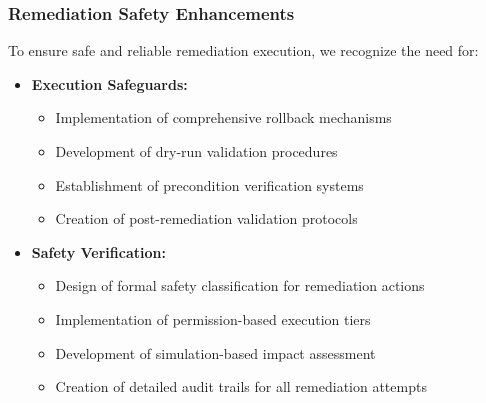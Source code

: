 \subsubsection{Remediation Safety Enhancements}
To ensure safe and reliable remediation execution, we recognize the need for:
\begin{itemize}
    \item \textbf{Execution Safeguards:}
        \begin{itemize}
            \item Implementation of comprehensive rollback mechanisms
            \item Development of dry-run validation procedures
            \item Establishment of precondition verification systems
            \item Creation of post-remediation validation protocols
        \end{itemize}
    \item \textbf{Safety Verification:}
        \begin{itemize}
            \item Design of formal safety classification for remediation actions
            \item Implementation of permission-based execution tiers
            \item Development of simulation-based impact assessment
            \item Creation of detailed audit trails for all remediation attempts
        \end{itemize}
\end{itemize}

